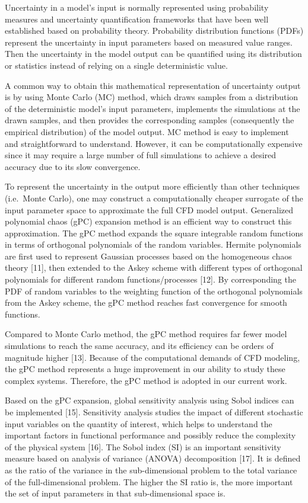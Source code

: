 \documentclass[
]{article}
\begin{document}
Uncertainty in a model's input is normally represented using probability
measures and uncertainty quantification frameworks that have been well
established based on probability theory. Probability distribution
functions (PDFs) represent the uncertainty in input parameters based on
measured value ranges. Then the uncertainty in the model output can be
quantified using its distribution or statistics instead of relying on a
single deterministic value.

A common way to obtain this mathematical representation of uncertainty
output is by using Monte Carlo (MC) method, which draws samples from a
distribution of the deterministic model's input parameters, implements
the simulations at the drawn samples, and then provides the
corresponding samples (consequently the empirical distribution) of the
model output. MC method is easy to implement and straightforward to
understand. However, it can be computationally expensive since it may
require a large number of full simulations to achieve a desired accuracy
due to its slow convergence.

To represent the uncertainty in the output more efficiently than other
techniques (i.e.~Monte Carlo), one may construct a computationally
cheaper surrogate of the input parameter space to approximate the full
CFD model output. Generalized polynomial chaos (gPC) expansion method is
an efficient way to construct this approximation. The gPC method expands
the square integrable random functions in terms of orthogonal
polynomials of the random variables. Hermite polynomials are first used
to represent Gaussian processes based on the homogeneous chaos theory
{[}11{]}, then extended to the Askey scheme with different types of
orthogonal polynomials for different random functions/processes
{[}12{]}. By corresponding the PDF of random variables to the weighting
function of the orthogonal polynomials from the Askey scheme, the gPC
method reaches fast convergence for smooth functions.

Compared to Monte Carlo method, the gPC method requires far fewer model
simulations to reach the same accuracy, and its efficiency can be orders
of magnitude higher {[}13{]}. Because of the computational demands of
CFD modeling, the gPC method represents a huge improvement in our
ability to study these complex systems. Therefore, the gPC method is
adopted in our current work.

Based on the gPC expansion, global sensitivity analysis using Sobol
indices can be implemented {[}15{]}. Sensitivity analysis studies the
impact of different stochastic input variables on the quantity of
interest, which helps to understand the important factors in functional
performance and possibly reduce the complexity of the physical system
{[}16{]}. The Sobol index (SI) is an important sensitivity measure based
on analysis of variance (ANOVA) decomposition {[}17{]}. It is defined as
the ratio of the variance in the sub-dimensional problem to the total
variance of the full-dimensional problem. The higher the SI ratio is,
the more important the set of input parameters in that sub-dimensional
space is.
\end{document}
